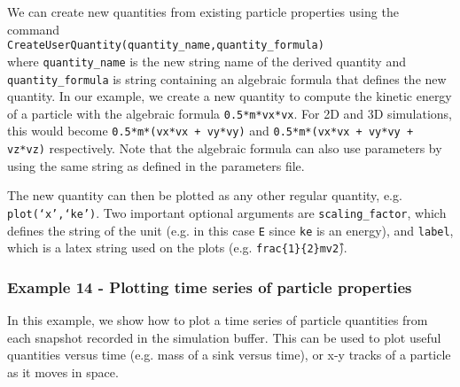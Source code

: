 \documentclass[a4paper]{article}
\newcommand{\var}[1]{\texttt{#1}}
\newcommand{\singlecommand}[1]{\\ \newline \indent \var{#1} \\ \newline \noindent}
\begin{document}




\noindent We can create new quantities from existing particle properties using the command \singlecommand{CreateUserQuantity(quantity\_name,quantity\_formula)} where \var{quantity\_name} is the new string name of the derived quantity and \var{quantity\_formula} is string containing an algebraic formula that defines the new quantity.  In our example, we create a new quantity to compute the kinetic energy of a particle with the algebraic formula \var{0.5*m*vx*vx}.  For 2D and 3D simulations, this would become \var{0.5*m*(vx*vx + vy*vy)} and \var{0.5*m*(vx*vx + vy*vy + vz*vz)} respectively.  Note that the algebraic formula can also use parameters by using the same string as defined in the parameters file.

The new quantity can then be plotted as any other regular quantity, e.g. \var{plot(`x',`ke')}.  Two important optional arguments are \var{scaling\_factor}, which defines the string of the unit (e.g. in this case \var{E} since \var{ke} is an energy), and \var{label}, which is a latex string used on the plots (e.g. \var{frac\{1\}\{2\}mv\^2}).



\subsubsection{Example  14 - Plotting time series of particle properties}
In this example, we show how to plot a time series of particle quantities from each snapshot recorded in the simulation buffer.  This can be used to plot useful quantities versus time (e.g. mass of a sink versus time), or x-y tracks of a particle as it moves in space. \\

\end{document}
